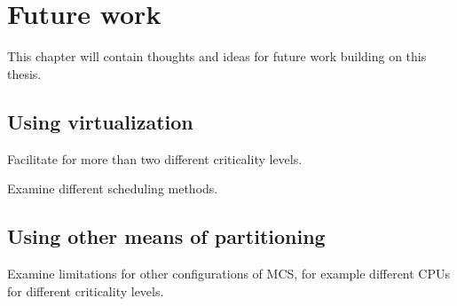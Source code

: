 \chapter{Future work}
This chapter will contain thoughts and ideas for future work building on this thesis.

\section{Using virtualization}
Facilitate for more than two different criticality levels.

Examine different scheduling methods. %

\section{Using other means of partitioning}
Examine limitations for other configurations of MCS, for example different CPUs for different criticality levels.
